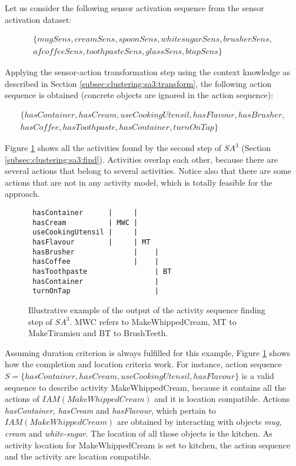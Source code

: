 Let us consider the following sensor activation sequence from the sensor activation dataset:

\begin{equation*}
\begin{split}
 \{mugSens, creamSens, spoonSens, whitesugarSens, brusherSens, \\ 
 afcoffeeSens, toothpasteSens, glassSens, btapSens\}
\end{split}  
\end{equation*}

Applying the sensor-action transformation step using the context knowledge as described in Section \ref{subsec:clustering:sa3:transform}, the following action sequence is obtained (concrete objects are ignored in the action sequence):

\begin{equation*}
\begin{split}
 \{hasContainer, hasCream, useCookingUtensil, hasFlavour, hasBrusher, \\ 
 hasCoffee, hasToothpaste, hasContainer, turnOnTap\}
\end{split}  
\end{equation*}

Figure \ref{fig:overlap-l} shows all the activities found by the second step of $SA^3$ (Section \ref{subsec:clustering:sa3:find}). Activities overlap each other, because there are several actions that belong to several activities. Notice also that there are some actions that are not in any activity model, which is totally feasible for the approach.

\begin{figure}[htbp]
 \begin{small}
\begin{lstlisting}
 hasContainer      |     |
 hasCream          | MWC |
 useCookingUtensil |     |
 hasFlavour        |     | MT 
 hasBrusher              |    |
 hasCoffee               |    |
 hasToothpaste                | BT
 hasContainer                 |
 turnOnTap                    |
\end{lstlisting}
\caption{Illustrative example of the output of the activity sequence finding step of $SA^3$. MWC refers to MakeWhippedCream, MT to MakeTiramisu  and BT to BrushTeeth.}
\label{fig:overlap-l}
\end{small}
\end{figure}

Assuming duration criterion is always fulfilled for this example, Figure \ref{fig:overlap-l} shows how the completion and location criteria work. For instance, action sequence $S = \{hasContainer, hasCream, useCookingUtensil, hasFlavour\}$ is a valid sequence to describe activity MakeWhippedCream, because it contains all the actions of $IAM(MakeWhippedCream)$ and it is location compatible. Actions \textit{hasContainer, hasCream} and \textit{hasFlavour}, which pertain to $IAM(MakeWhippedCream)$ are obtained by interacting with objects \textit{mug, cream} and \textit{white-sugar}. The location of all those objects is the kitchen. As activity location for MakeWhippedCream is set to kitchen, the action sequence and the activity are location compatible.

